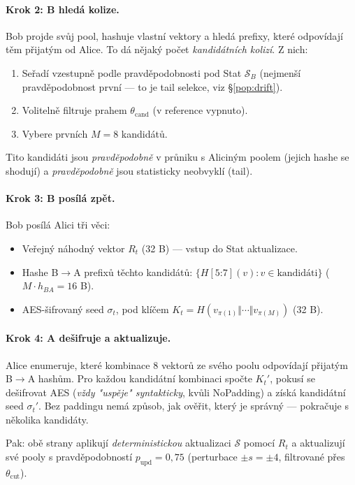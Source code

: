 \documentclass[11pt,a4paper]{article}
\begin{document}
\paragraph{Krok 2: B hledá kolize.}
Bob projde svůj pool, hashuje vlastní vektory a hledá prefixy, které odpovídají těm přijatým od Alice. To dá nějaký počet \emph{kandidátních kolizí}. Z nich:
\begin{enumerate}[leftmargin=*]
\item Seřadí vzestupně podle pravděpodobnosti pod Stat $\mathcal{S}_B$ (nejmenší pravděpodobnost první --- to je tail selekce, viz §\ref{pop:drift}).
\item Volitelně filtruje prahem $\theta_\text{cand}$ (v reference vypnuto).
\item Vybere prvních $M = 8$ kandidátů.
\end{enumerate}
Tito kandidáti jsou \emph{pravděpodobně} v průniku s Aliciným poolem (jejich hashe se shodují) a \emph{pravděpodobně} jsou statistic\-ky neobvyklí (tail).

\paragraph{Krok 3: B posílá zpět.}
Bob posílá Alici tři věci:
\begin{itemize}[leftmargin=*]
\item Veřejný náhodný vektor $R_t$ (32 B) --- vstup do Stat aktualizace.
\item Hashe B$\to$A prefixů těchto kandidátů: $\{H[5\mathord{:}7](v) : v \in \text{kandidáti}\}$ ($M \cdot h_{BA} = 16$ B).
\item AES-šifrovaný seed $\sigma_t$, pod klíčem $K_t = H(v_{\pi(1)} \Vert \cdots \Vert v_{\pi(M)})$ (32 B).
\end{itemize}

\paragraph{Krok 4: A dešifruje a aktualizuje.}
Alice enumeruje, které kombinace 8 vektorů ze svého poolu odpovídají přijatým B$\to$A hashům. Pro každou kandidátní kombinaci spočte $K_t'$, pokusí se dešifrovat AES (\emph{vždy "uspěje" syntakticky}, kvůli NoPadding) a získá kandidátní seed $\sigma_t'$. Bez paddingu nemá způsob, jak ověřit, který je správný --- pokračuje s několika kandidáty.

Pak: obě strany aplikují \emph{deterministickou} aktualizaci $\mathcal{S}$ pomocí $R_t$ a aktualizují své pooly s pravděpodobností $p_\text{upd} = 0{,}75$ (perturbace $\pm s = \pm 4$, filtrované přes $\theta_\text{cut}$).
\end{document}
